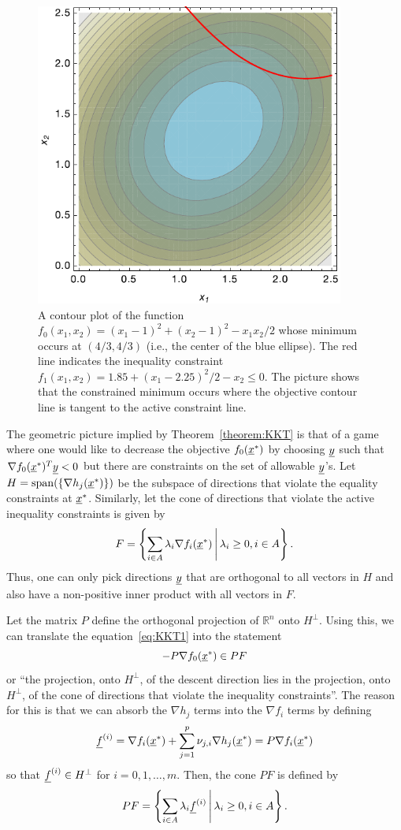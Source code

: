\begin{figure}[t]
  \begin{center}
    \includegraphics[width=4in]{opt_fig}
  \end{center}
  \caption{A contour plot of the function $f_0 (x_1,x_2) = (x_1 - 1)^2 + (x_2 - 1)^2 - x_1 x_2 /2$ whose minimum occurs at $(4/3,4/3)$ (i.e., the center of the blue ellipse).  The red line indicates the inequality constraint $f_1 (x_1,x_2)= 1.85 + (x_1 - 2.25)^2 / 2 - x_2 \leq 0$. The picture shows that the constrained minimum occurs where the objective contour line is tangent to the active constraint line.}
\end{figure}

The geometric picture implied by Theorem~\ref{theorem:KKT} is that of a game where one would like to decrease the objective $f_0 (\underline{x}^*)$ by choosing $\underline{y}$ such that $\nabla f_0 (\underline{x}^*)^T \underline{y}  < 0$ but there are  constraints on the set of allowable $\underline{y}$'s.
Let $H = \mathrm{span} ( \{ \nabla h_j (\underline{x}^*) \})$ be the subspace of directions that violate the equality constraints at $\underline{x}^*$.
Similarly, let the cone of directions that violate the active inequality constraints is given by
\[ F = \left\{ \sum_{i\in A} \lambda_i \nabla f_i (\underline{x}^*) \, \middle| \, \lambda_i \geq 0, i \in A   \right\}. \]
Thus, one can only pick directions $\underline{y}$ that are orthogonal to all vectors in $H$ and also have a non-positive inner product with all vectors in $F$.

Let the matrix $P$ define the orthogonal projection of $\mathbb{R}^n$ onto $H^\perp$.
Using this, we can translate the equation~\eqref{eq:KKT1} into the statement
\[ -P \nabla f_0 (\underline{x}^*) \in P F \]  or ``the projection, onto $H^\perp$, of the descent direction  lies in the projection, onto $H^\perp$, of the cone of directions that violate the inequality constraints''.
The reason for this is that we can absorb the $\nabla h_j$ terms into the $\nabla f_i$ terms by defining
\[ \underline{f}^{(i)} = \nabla f_i (\underline{x}^*) + \sum_{j=1}^p \nu_{j,i} \nabla h_j (\underline{x}^*) = P \nabla f_i (\underline{x}^*) \]
so that $\underline{f}^{(i)} \in H^{\perp}$ for $i=0,1,\ldots,m$.
Then, the cone $PF$ is defined by
\[ PF = \left\{ \sum_{i\in A} \lambda_i \underline{f}^{(i)} \, \middle| \, \lambda_i \geq 0, i\in A \right\}. \]

